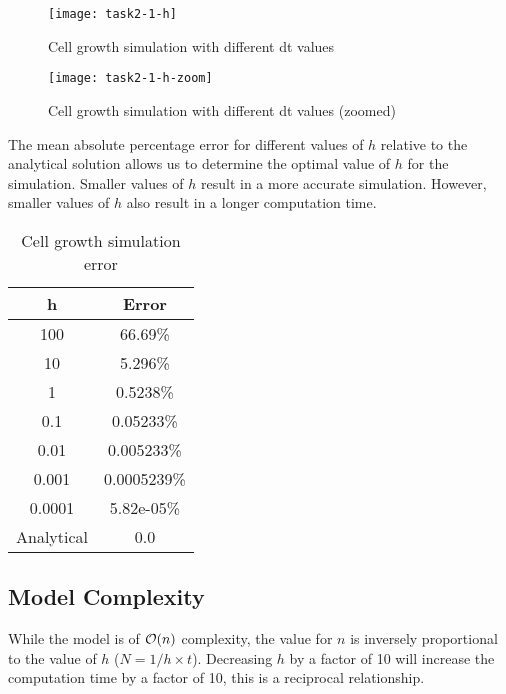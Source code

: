 \begin{figure}[ht]
    \centering
    \texttt{[image: task2-1-h]}
    \caption[Cell growth simulation with different dt values]{Cell growth simulation with different dt values}
    \label{fig:task2-1-h}
\end{figure}

\clearpage

\begin{figure}[ht]
    \centering
    \texttt{[image: task2-1-h-zoom]}
    \caption[Cell growth simulation with different dt values (zoomed)]{Cell growth simulation with different dt values (zoomed)}
    \label{fig:task2-1-h-zoom}
\end{figure}

The mean absolute percentage error for different values of $h$ relative to the analytical solution allows us to determine the optimal value of $h$ for the simulation.
Smaller values of $h$ result in a more accurate simulation.
However, smaller values of $h$ also result in a longer computation time.


\begin{table}[ht]
    \centering
    \begin{tabular}{c | c} 
        h & Error \\
        \hline
        100 & 66.69\% \\
        10 & 5.296\% \\
        1 & 0.5238\% \\
        0.1 & 0.05233\% \\
        0.01 & 0.005233\% \\
        0.001 & 0.0005239\% \\
        0.0001 & 5.82e-05\% \\
        Analytical & 0.0 \\
    \end{tabular}
    \caption[Cell growth simulation error]{Cell growth simulation error}
\end{table}


\clearpage

\subsection{Model Complexity}

While the model is of $\mathcal{O}(n)$ complexity, the value for $n$ is inversely proportional to the value of $h$ ($N = 1/h \times t$).
Decreasing $h$ by a factor of 10 will increase the computation time by a factor of 10, this is a reciprocal relationship.

